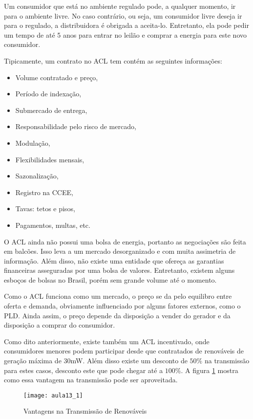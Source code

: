 Um consumidor que está no ambiente regulado pode, a qualquer momento, ir para o ambiente livre. No caso contrário, ou seja, um consumidor livre deseja ir para o regulado, a distribuidora é obrigada a aceita-lo. Entretanto, ela pode pedir um tempo de até 5 anos para entrar no leilão e comprar a energia para este novo consumidor. 

Tipicamente, um contrato no ACL tem contém as seguintes informações:

\begin{itemize}
\item Volume contratado e preço,
\item Período de indexação,
\item Submercado de entrega,
\item Responsabilidade pelo risco de mercado,
\item Modulação,
\item Flexibilidades mensais,
\item Sazonalização,
\item Registro na CCEE,
\item Tavas: tetos e pisos,
\item Pagamentos, multas, etc.
\end{itemize}

O ACL ainda não possui uma bolsa de energia, portanto as negociações são feita em balcões. Isso leva a um mercado desorganizado e com muita assimetria de informação. Além disso, não existe uma entidade que ofereça as garantias financeiras asseguradas por uma bolsa de valores. Entretanto, existem alguns esboços de bolsas no Brasil, porém sem grande volume até o momento. 

Como o ACL funciona como um mercado, o preço se da pelo equilibro entre oferta e demanda, obviamente influenciado por alguns fatores externos, como o PLD. Ainda assim, o preço depende da disposição a vender do gerador e da disposição a comprar do consumidor. 

Como dito anteriormente, existe também um ACL incentivado, onde consumidores menores podem participar desde que contratados de renováveis de geração máxima de 30mW. Além disso existe um desconto de $50\%$ na transmissão para estes casos, desconto este que pode chegar até a $100\%$. A figura \ref{fig:aula13_1} mostra como essa vantagem na transmissão pode ser aproveitada. 


\begin{figure}[H]
\begin{centering}
\texttt{[image: aula13\_1]}\protect\caption{\label{fig:aula13_1} Vantagens na Transmissão de Renováveis}
\end{centering}
\end{figure}

